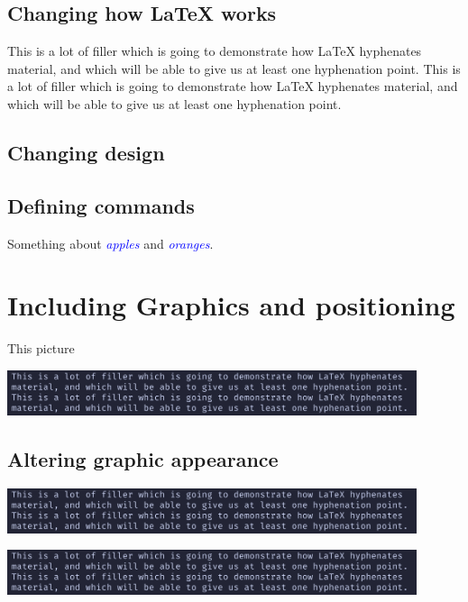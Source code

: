 \documentclass{article}
\newcommand\kw[1]{\textcolor{blue}{\itshape #1}}
\begin{document}
\subsection{Changing how LaTeX works}

This is a lot of filler which is going to demonstrate how LaTeX hyphenates
material, and which will be able to give us at least one hyphenation point.
This is a lot of filler which is going to demonstrate how LaTeX hyphenates
material, and which will be able to give us at least one hyphenation point.

\subsection{Changing design}
\subsection{Defining commands}
Something about \kw{apples} and \kw{oranges}.

\section{Including Graphics and positioning}

This picture
\begin{center}
  \includegraphics[width = 0.9\textwidth]{Snipaste_2023-08-23_12-30-28.png}
\end{center}
\subsection{Altering graphic appearance}

\begin{center}
  \includegraphics[height = 0.1\textwidth, width = 0.9\textwidth]{Snipaste_2023-08-23_12-30-28.png}
\end{center}
\begin{center}
  \includegraphics[clip, trim = 0 0 50 50, width = 0.9\textwidth]{Snipaste_2023-08-23_12-30-28.png}
\end{center}
\end{document}
